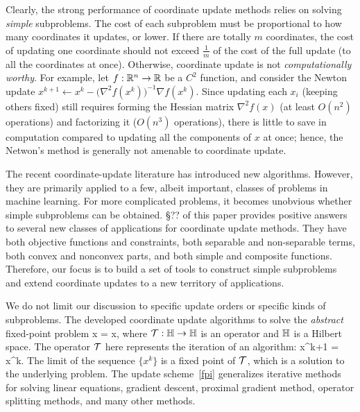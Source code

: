  Clearly, the strong performance of coordinate
update methods relies on solving \emph{simple} subproblems. The cost of each subproblem must be proportional to how many coordinates it updates, or lower. %
If there are totally $m$ coordinates, the cost of updating one coordinate should not exceed $\frac{1}{m}$ of the cost of the full update (to all the coordinates at once). Otherwise, coordinate update is not \emph{computationally worthy}. For example, let  $f:\mathbb{R}^n\to \mathbb{R}$ be  a $C^2$ function, and consider the Newton update  $x^{k+1} \gets x^k - \big(\nabla^2 f(x^k)\big)^{-1}\nabla f(x^k)$. Since updating each $x_i$ (keeping others  fixed) still requires forming the Hessian matrix $\nabla^2 f(x)$ (at least $O(n^2)$ operations) and factorizing it ($O(n^3)$ operations), there is little to save in computation compared to updating all the components of $x$ at once; hence, the Netwon's method is generally not amenable to coordinate update. 

The recent coordinate-update literature has introduced new algorithms. However, they are primarily applied to a few, albeit important, classes of problems  in machine learning. For more complicated problems,  it becomes unobvious whether simple subproblems can be obtained. \S ?? of this paper provides positive answers to several new classes of applications for coordinate update methods. They have both objective functions and constraints, both separable and non-separable terms, both
convex and nonconvex parts, and both simple and composite functions. Therefore, our focus is to build a set of tools to construct simple subproblems and extend  coordinate updates to a new territory of applications.

We do not limit our discussion to specific update orders or specific kinds of subproblems.  The developed coordinate update algorithms to
solve the \emph{abstract} fixed-point problem
\beq\label{fpprob}
x = \cT x,
\eeq
where  ${\mathcal{T}}:\mathbb{H} \to \mathbb{H}$ is an operator and $\mathbb{H}$ is a Hilbert space. 
The operator ${\mathcal{T}}$ here represents the iteration of an algorithm:
\beq\label{fpi}
x^{k+1} = \cT x^k.
\eeq
The limit of the sequence $\{x^k\}$  is a fixed point of ${\mathcal{T}}$, which is  a solution to the underlying problem. The update scheme~\eqref{fpi} generalizes iterative methods for solving linear equations, gradient descent, proximal gradient method,  operator splitting methods, and many other methods.

